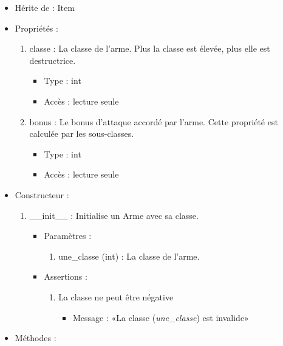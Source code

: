 \documentclass[12pt,pdftex,oneside]{article}
\begin{document}
  \begin{itemize}
  \item Hérite de : Item
  \item Propriétés : 
    \begin{enumerate}
    \item classe : La classe de l'arme. Plus la classe est élevée, plus elle est destructrice.
          \begin{itemize}
          \item Type : int
          \item Accès : lecture seule
          \end{itemize}
    \item bonus : Le bonus d'attaque accordé par l'arme. Cette propriété est
      calculée par les sous-classes.
          \begin{itemize}
          \item Type : int
          \item Accès : lecture seule
          \end{itemize}

    \end{enumerate}

  \item Constructeur : 

  \begin{enumerate}
  \item \_\_init\_\_ : Initialise un Arme avec sa classe.
    \begin{itemize}
    \item Paramètres : 
      \begin{enumerate}
      \item une\_classe (int) : La classe de l'arme.
      \end{enumerate}
      \item Assertions : 
        \begin{enumerate}
        \item La classe ne peut être négative
          \begin{itemize}
          \item Message : «La classe (\emph{une\_classe}) est invalide»
          \end{itemize}
        \end{enumerate}
    \end{itemize}

  \end{enumerate}

  \item Méthodes : 


\end{itemize}
\end{document}
